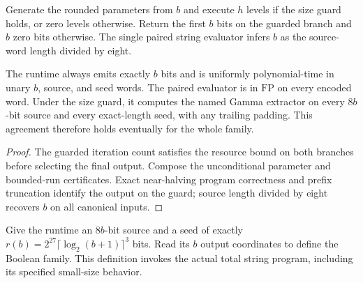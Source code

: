 \begin{definition}
  \label{def:lowerbounds-algebraic-gamma-program}
  \leanok
  Generate the rounded parameters from $b$ and execute $h$ levels if the
  size guard holds, or zero levels otherwise. Return the first $b$ bits
  on the guarded branch and $b$ zero bits otherwise. The single paired
  string evaluator infers $b$ as the source-word length divided by eight.
\end{definition}

\begin{theorem}
  \label{thm:lowerbounds-algebraic-gamma-program}
  \leanok
  The runtime always emits exactly $b$ bits and is uniformly
  polynomial-time in unary $b$, source, and seed words. The paired
  evaluator is in $\mathrm{FP}$ on every encoded word.
  Under the size guard, it computes the named Gamma extractor on every
  $8b$-bit source and every exact-length seed, with any trailing padding.
  This agreement therefore holds eventually for the whole family.
\end{theorem}
\begin{proof}
  \leanok
  The guarded iteration count satisfies the resource bound on both
  branches before selecting the final output. Compose the unconditional
  parameter and bounded-run certificates. Exact near-halving program
  correctness and prefix truncation identify the output on the guard;
  source length divided by eight recovers $b$ on all canonical inputs.
\end{proof}

\begin{definition}
  \label{def:lowerbounds-algebraic-gamma-padded}
  \leanok
  Give the runtime an $8b$-bit source and a seed of exactly
  $r(b)=2^{27}\lceil\log_2(b+1)\rceil^3$ bits. Read its $b$ output
  coordinates to define the Boolean family. This definition invokes the
  actual total string program, including its specified small-size behavior.
\end{definition}

